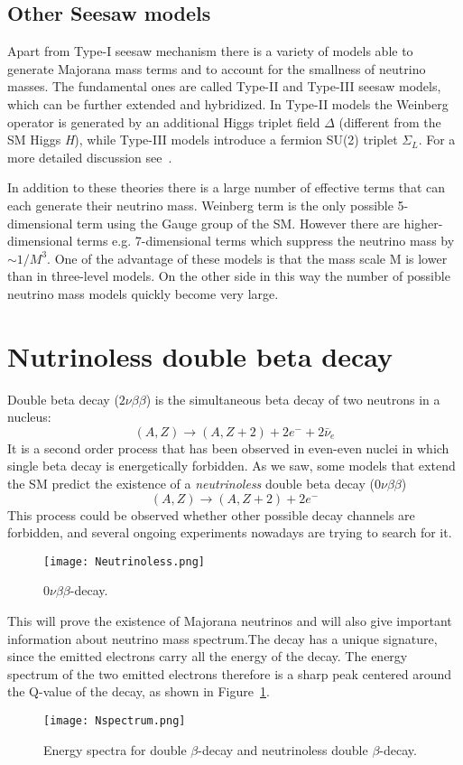 \documentclass{subnucbo}
\begin{document}
\subsection{Other Seesaw models}
Apart from Type-I seesaw mechanism there is a variety of models able to generate Majorana mass terms and to account for the smallness of neutrino masses.
The fundamental ones are called Type-II and Type-III seesaw models, which can be further extended and hybridized.
In Type-II models the Weinberg operator is generated by an additional Higgs triplet field $\Delta$ (different from the SM Higgs \emph{H}), while Type-III models introduce a fermion SU(2) triplet $\Sigma_L$. For a more detailed discussion see~\cite{ref:front}.

In addition to these theories there is a large number of effective terms that can each generate their neutrino mass. Weinberg term is the only possible 5-dimensional term using the Gauge group of the SM. However there are higher-dimensional terms e.g. 7-dimensional terms which suppress the neutrino mass by $\sim1/M^3$.
One of the advantage of these models is that the mass scale M is lower than in three-level models. On the other side in this way the number of possible neutrino mass models quickly become very large.

\section{Nutrinoless double beta decay}
Double beta decay ($2\nu\beta\beta$) is the simultaneous beta decay of two neutrons in a nucleus: 
\begin{equation}
(A, Z)\rightarrow(A, Z+2)+2e^-+2\bar{\nu}_e
\end{equation}
It is a second order process that has been observed in even-even nuclei in which single beta decay is energetically forbidden. As we saw, some models that extend the SM predict the existence of a \emph{neutrinoless} double beta decay ($0\nu\beta\beta$)
\begin{equation}
(A, Z)\rightarrow(A, Z+2)+2e^-
\end{equation}
This process could be observed whether other possible decay channels are forbidden, and several ongoing experiments nowadays are trying to search for it.
\begin{wrapfigure}{l}
{0.35\textwidth}
\texttt{[image: Neutrinoless.png]}
\caption{$0\nu\beta\beta$-decay.}
\vspace{-10pt}
\end{wrapfigure}
 This will prove the existence of Majorana neutrinos and will also give important information about neutrino mass spectrum.The decay has a unique signature, since the emitted electrons carry all the energy of the decay. The energy spectrum of the two emitted electrons therefore is a sharp peak centered around the Q-value of the decay, as shown in Figure~\ref{fig:Nspectrum}.
\begin{figure}
\centering
\texttt{[image: Nspectrum.png]}
\caption{Energy spectra for double $\beta$-decay and neutrinoless double $\beta$-decay.}
\label{fig:Nspectrum}
\end{figure}
\end{document}
